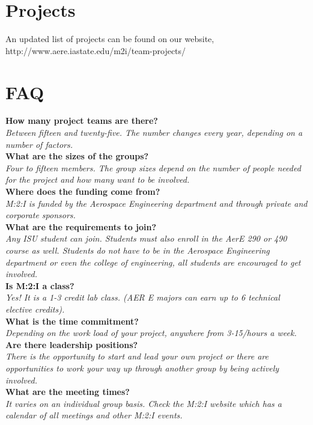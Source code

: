 \documentclass[10pt,foldmark,notumble]{leaflet}
\begin{document}
\section{Projects}
An updated list of projects can be found on our website, http://www.aere.iastate.edu/m2i/team-projects/

\section{FAQ}
\textbf{How many project teams are there?} \ \\
\textit{Between fifteen and twenty-five. The number changes every year, depending on a number of factors.}\ \\ 
\textbf{What are the sizes of the groups?}\ \\
\textit{Four to fifteen members. The group sizes depend on the number of people needed for the project and how many want to be involved.}\ \\
\textbf{Where does the funding come from?}\ \\
\textit{M:2:I is funded by the Aerospace Engineering department and through private and corporate sponsors.}\ \\ 
\textbf{What are the requirements to join?}\ \\
\textit{Any ISU student can join.  Students must also enroll in the AerE 290 or 490 course as well.  Students do not have to be in the Aerospace Engineering department or even the college of engineering, all students are encouraged to get involved.}\ \\
\textbf{Is M:2:I a class?}\ \\
\textit{Yes! It is a 1-3 credit lab class. (AER E majors can earn up to 6 technical elective credits).}\ \\
\textbf{What is the time commitment?}\ \\
\textit{Depending on the work load of your project, anywhere from 3-15/hours a week.}\ \\
\textbf{Are there leadership positions?}\ \\
\textit{There is the opportunity to start and lead your own project or there are opportunities to work your way up through another group by being actively involved.}\ \\ 
\textbf{What are the meeting times?}\ \\
\textit{It varies on an individual group basis. Check the M:2:I website which has a calendar of all meetings and other M:2:I events.}\ \\
\end{document}
